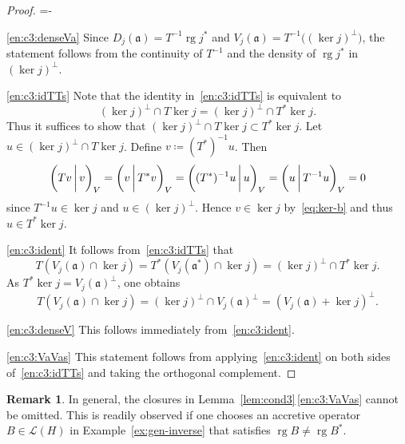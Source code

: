 \documentclass[a4paper,oneside,12pt]{amsart}
\makeatletter
\theoremstyle{plain}
\theoremstyle{definition}
\newtheorem{remark}[theorem]{Remark}
\newenvironment{parenum}[1][]{\my@savedparindent=\parindent\ifthenelse{\equal{#1}{}}{\asparaenum}{\asparaenum[#1]}\advance\itemindent-\my@savedparindent
\patchcmd{\@item}{\ignorespaces}{{\itemindent={\the\itemindent}
\def{}}\ignorespaces}{}{}}
{\endasparaenum}
\makeatother
\begin{document}
\begin{proof}
\begin{parenum}
\item[\ref{en:c3:denseVa}] Since $D_j({{\mathfrak{{a}}}})=T^{-1}\operatorname{rg} j^*$ and $V_j({{\mathfrak{{a}}}})=T^{-1}\bigl((\ker j)^\perp\bigr)$, the
statement follows from the continuity of $T^{-1}$ and the density of $\operatorname{rg} j^*$ in $(\ker j)^\perp$.

\item[\ref{en:c3:idTTs}] 
Note that the identity in~\ref{en:c3:idTTs} is equivalent to 
\[
    (\ker j)^\perp\cap T\ker j = (\ker j)^\perp\cap T^*\ker j.
\]
Thus it suffices to show that $(\ker j)^\perp\cap T\ker j \subset T^*\ker j$.
Let $u\in (\ker j)^\perp\cap T\ker j$. Define $v\coloneqq (T^*)^{-1}u$. Then
\[
    {{\ifthenelse{\equal{auto}{auto}}{\left({Tv}\mkern3mu{\biggm|}\mkern3mu {v}\right)}{}
\ifthenelse{\equal{auto}{b}}{\bigl({Tv}\mkern3mu{\biggm|}\mkern3mu {v}\bigr)}{}
\ifthenelse{\equal{auto}{B}}{\Bigl({Tv}\mkern3mu{\bigm|}\mkern3mu {v}\Bigr)}{}
}}_V={{\ifthenelse{\equal{auto}{auto}}{\left({v}\mkern3mu{\biggm|}\mkern3mu {T^*v}\right)}{}
\ifthenelse{\equal{auto}{b}}{\bigl({v}\mkern3mu{\biggm|}\mkern3mu {T^*v}\bigr)}{}
\ifthenelse{\equal{auto}{B}}{\Bigl({v}\mkern3mu{\bigm|}\mkern3mu {T^*v}\Bigr)}{}
}}_V={{\ifthenelse{\equal{auto}{auto}}{\left({(T^*)^{-1}u}\mkern3mu{\biggm|}\mkern3mu {u}\right)}{}
\ifthenelse{\equal{auto}{b}}{\bigl({(T^*)^{-1}u}\mkern3mu{\biggm|}\mkern3mu {u}\bigr)}{}
\ifthenelse{\equal{auto}{B}}{\Bigl({(T^*)^{-1}u}\mkern3mu{\bigm|}\mkern3mu {u}\Bigr)}{}
}}_V = {{\ifthenelse{\equal{auto}{auto}}{\left({u}\mkern3mu{\biggm|}\mkern3mu {T^{-1}u}\right)}{}
\ifthenelse{\equal{auto}{b}}{\bigl({u}\mkern3mu{\biggm|}\mkern3mu {T^{-1}u}\bigr)}{}
\ifthenelse{\equal{auto}{B}}{\Bigl({u}\mkern3mu{\bigm|}\mkern3mu {T^{-1}u}\Bigr)}{}
}}_V = 0
\]
since $T^{-1}u\in\ker j$ and $u\in(\ker j)^\perp$. Hence $v\in\ker j$ by~\eqref{eq:ker-b}
and thus $u\in T^*\ker j$.

\item[\ref{en:c3:ident}] 
It follows from~\ref{en:c3:idTTs} that
\[
	T(V_j({{\mathfrak{{a}}}})\cap\ker j) = T^*(V_j({{\mathfrak{{a}}}}^*)\cap\ker j) = (\ker j)^\perp\cap T^*\ker j.
\]
As $T^*\ker j = V_j({{\mathfrak{{a}}}})^\perp$, one obtains
\[
	T(V_j({{\mathfrak{{a}}}})\cap\ker j) = (\ker j)^\perp\cap V_j({{\mathfrak{{a}}}})^\perp = (V_j({{\mathfrak{{a}}}})+\ker j)^\perp.
\]

\item[\ref{en:c3:denseV}] This follows immediately from~\ref{en:c3:ident}.
\item[\ref{en:c3:VaVas}] This statement follows from applying~\ref{en:c3:ident} on both sides of~\ref{en:c3:idTTs} and taking the orthogonal complement.
\qedhere
\end{parenum}
\end{proof}
\begin{remark}
In general, the closures in Lemma~\ref{lem:cond3}\,\ref{en:c3:VaVas} cannot be omitted.
This is readily observed if one chooses an accretive operator $B\in{\mathcal{L}}(H)$ in Example~\ref{ex:gen-inverse} that satisfies $\operatorname{rg} B\ne\operatorname{rg} B^*$.
\end{remark}
\end{document}
